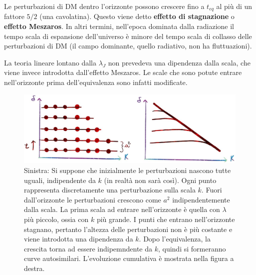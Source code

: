 \begin{definition} 
Le perturbazioni di DM dentro l'orizzonte possono crescere fino a $t_{eq}$ al più di un fattore $5/2$ (una cavolatina). Questo viene detto \textbf{effetto di stagnazione} o \textbf{effetto Meszaros}. In altri termini, nell'epoca dominata dalla radiazione il tempo scala di espansione dell'universo è minore del tempo scala di collasso delle perturbazioni di DM (il campo dominante, quello radiativo, non ha fluttuazioni).
\end{definition}

La teoria lineare lontano dalla $\lambda_J$ non prevedeva una dipendenza dalla scala, che viene invece introdotta dall'effetto Meszaros. Le scale che sono potute entrare nell'orizzonte prima dell'equivalenza sono infatti modificate. 


\begin{figure}[H]
    \centering
    \includegraphics[width=.95 \textwidth]{Pictures/6/meszarus.jpg}
    \caption{Sinistra: Si suppone che inizialmente le perturbazioni nascono tutte uguali, indipendente da $k$ (in realtà non sarà così). Ogni punto rappresenta discretamente una perturbazione sulla scala $k$. Fuori dall'orizzonte le perturbazioni crescono come $a^2$ indipendentemente dalla scala. La prima scala ad entrare nell'orizzonte è quella con $\lambda$ più piccolo, ossia con $k$ più grande. I punti che entrano nell'orizzonte stagnano, pertanto l'altezza delle perturbazioni non è più costante e viene introdotta una dipendenza da $k$. Dopo l'equivalenza, la crescita torna ad essere indipemndente da $k$, quindi si formeranno curve autosimilari. L'evoluzione cumulativa è mostrata nella figura a destra.}
\end{figure}


